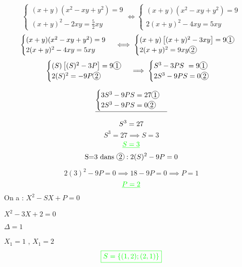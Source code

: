 \documentclass[12pt,a4paper]{article}
\begin{document}
\begin{enumerate}
\[
\begin{cases}
(x+y)(x^{2}-xy+y^{2}) = 9 \\
(x+y)^{2}-2xy = \frac{5}{2}xy
\end{cases}\iff
\begin{cases}
(x+y)(x^{2}-xy+y^{2}) = 9 \\
2(x+y)^{2}-4xy = 5xy
\end{cases}
\]
\[
\begin{cases}
(x+y)(x^{2}-xy+y^{2}) = 9 \\
2(x+y)^{2}-4xy = 5xy
\end{cases}\iff
\begin{cases}
(x+y)\left[ (x+y)^{2}-3xy\right]  = 9 \encercle{1}\\
2(x+y)^{2} = 9xy \encercle{2}
\end{cases}
\] 
\[
\begin{cases}
(S)\left[ (S)^{2}-3P\right]  = 9 \encercle{1}\\
2(S)^{2} = -9P \encercle{2}
\end{cases}\implies 
\begin{cases}
S^{3}-3PS\  = 9\encercle{1}\\
2S^{3} -9PS = 0 \encercle{2}
\end{cases}
\] 

\[
\underline{\begin{cases}
3S^{3}-9PS  = 27 \encercle{1}\\
2S^{3} -9PS = 0 \encercle{2}
\end{cases}}
\]

\[
S^{3}= 27\\
\]
\[
S^{3}=27\implies S=3
\]
\[
\textcolor{green}{\underline{ S=3 }}
\]
\[
\text{S=3 dans } \encercle{2}: 2(S)^{2} - 9P =0
\]

\[
 2(3)^{2} - 9P =0 \implies   18 - 9P =0 \implies P=1
\]
\[
\textcolor{green}{\underline{ P=2 }}
\]
On a : $X^{2}-SX+P=0$

$X^{2}-3X+2=0$

$\Delta = 1$

$X_{1}=1$ , $X_{1}=2$
\[
\textcolor{green}{\boxed{S = \{ (1,2);(2,1) \}   }} 
\]
\end{enumerate}
\end{document}
